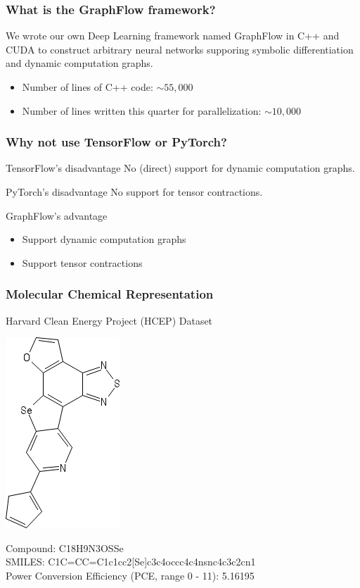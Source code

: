 \documentclass{beamer}
\begin{document}
\begin{frame}
\frametitle{What is the GraphFlow framework?}
We wrote our own Deep Learning framework named {\color{red} GraphFlow} in C++ and CUDA to construct arbitrary neural networks supporing symbolic differentiation and dynamic computation graphs. 
\begin{itemize}
	\item Number of lines of C++ code: $\sim 55,000$
	\item Number of lines written this quarter for parallelization: {\color{red} $\sim 10,000$}
\end{itemize}
\end{frame}

\begin{frame}
\frametitle{Why not use TensorFlow or PyTorch?}
\begin{block}{TensorFlow's disadvantage}
No (direct) support for dynamic computation graphs.
\end{block}
\begin{block}{PyTorch's disadvantage}
No support for tensor contractions.
\end{block}
\begin{alertblock}{GraphFlow's advantage}
	\begin{itemize}
		\item Support dynamic computation graphs
		\item Support tensor contractions
	\end{itemize}
\end{alertblock}
\end{frame}

\begin{frame}
\frametitle{Molecular Chemical Representation}
\begin{justify}
\begin{center}
	Harvard Clean Energy Project (HCEP) Dataset \cite{Johannes}
\end{center}
\begin{center}
	\includegraphics[scale=0.5]{sketcher}
\end{center}
Compound: C18H9N3OSSe \\
SMILES: C1C=CC=C1c1cc2[Se]c3c4occc4c4nsnc4c3c2cn1 \\
Power Conversion Efficiency (PCE, range 0 - 11): 5.16195
\end{justify}
\end{frame}
\end{document}
